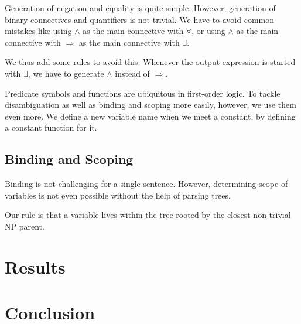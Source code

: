 \documentclass{article}
\begin{document}
{{		Generation of negation and equality is quite simple. However, generation of binary connectives and quantifiers is not trivial. We have to avoid common mistakes like using $\wedge $ as the main connective with $\forall $, or using $\wedge $ as the main connective with $\Rightarrow $ as the main connective with $\exists $. 

		We thus add some rules to avoid this. Whenever the output expression is started with $\exists $, we have to generate $\wedge $ instead of $\Rightarrow$. 

		Predicate symbols and functions are ubiquitous in first-order logic. To tackle disambiguation as well as binding and scoping more easily, however, we use them even more. We define a new variable name when we meet a constant, by defining a constant function for it. 
	}

	\subsection{Binding and Scoping}{

		Binding is not challenging for a single sentence. However, determining scope of variables is not even possible without the help of parsing trees. 


		Our rule is that a variable lives within the tree rooted by the closest non-trivial NP parent. 
	}
}

\section{Results}{}

\section{Conclusion}{


}



\citation
\end{document}
